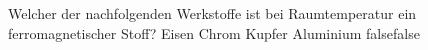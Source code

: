     {Welcher der nachfolgenden Werkstoffe ist bei Raumtemperatur ein ferromagnetischer Stoff?}
    {Eisen}
    {Chrom}
    {Kupfer}
    {Aluminium}
    {false}{false}